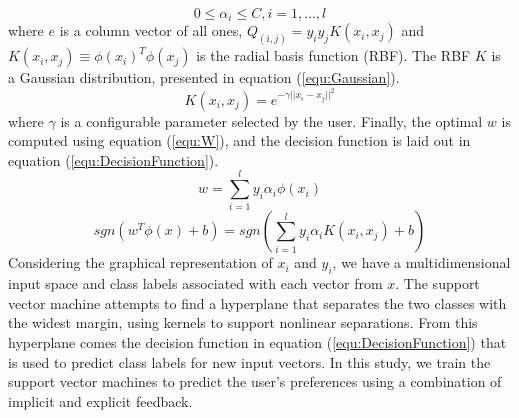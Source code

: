 \[ 0 \le \alpha_i \le C, i = 1,\ldots ,l \]
where $e$ is a column vector of all ones, $Q_(i,j)=y_i y_j K(x_i,x_j)$ and $K(x_i,x_j ) \equiv \phi (x_i )^T \phi (x_j)$ is the radial basis function (RBF). The RBF $K$ is a Gaussian distribution, presented in equation (\ref{equ:Gaussian}).
\begin{equation}
\label{equ:Gaussian}
K(x_i, x_j) = e^{-\gamma ||x_i - x_j||^{2}}
\end{equation}
where $\gamma$ is a configurable parameter selected by the user. Finally, the optimal $w$ is computed using equation (\ref{equ:W}), and the decision function is laid out in equation (\ref{equ:DecisionFunction}).
\begin{equation}
\label{equ:W}
w = \sum_{i=1}^{l} y_i \alpha_i \phi (x_i)
\end{equation}
\begin{equation}
\label{equ:DecisionFunction}
sgn(w^T\phi (x) + b) = sgn(\sum_{i=1}^{l} y_i\alpha_i K(x_i, x_j) +b)
\end{equation}
Considering the graphical representation of $x_i$ and $y_i$, we have a multidimensional input space and class labels associated with each vector from $x$. The support vector machine attempts to find a hyperplane that separates the two classes with the widest margin, using kernels to support nonlinear separations. From this hyperplane comes the decision function in equation (\ref{equ:DecisionFunction}) that is used to predict class labels for new input vectors. In this study, we train the support vector machines to predict the user’s preferences using a combination of implicit and explicit feedback. 

